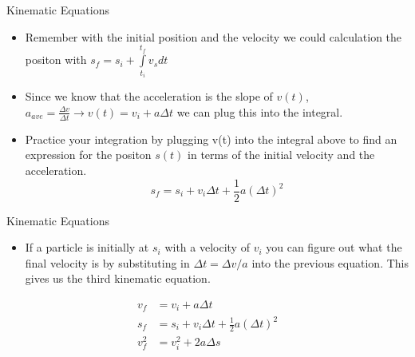\documentclass{beamer}
\begin{document}
\begin{frame}{Kinematic Equations}
\begin{itemize}
   \item Remember with the initial position and the velocity we could calculation the positon with $s_f = s_i + \int\limits_{t_i}^{t_f} v_s dt$
   \item Since we know that the acceleration is the slope of $v(t)$, $a_{ave}=\frac{\Delta v}{\Delta t} \rightarrow v(t) = v_i + a\Delta t$ we can plug this into the integral.
   \item<2-> Practice your integration by plugging v(t) into the integral above to find an expression for the positon $s(t)$ in terms of the initial velocity and the acceleration.
   \begin{equation*}
      s_f = s_i + v_i\Delta t + \frac{1}{2}a(\Delta t)^2
   \end{equation*}
\end{itemize}
\end{frame}

\begin{frame}{Kinematic Equations}
\begin{itemize}
   \item If a particle is initially at $s_i$ with a velocity of $v_i$ you can figure out what the final velocity is by substituting in $\Delta t = \Delta v/a$ into the previous equation. This gives us the third kinematic equation.
\end{itemize}
\begin{center}
\begin{shaded}
\begin{align}
   v_f &= v_i + a\Delta t \\
   s_f &= s_i + v_i\Delta t + \frac{1}{2}a(\Delta t)^2 \\
   v_f^2 &= v_i^2 + 2a\Delta s
\end{align}
\end{shaded}
\end{center}
\end{frame}
\end{document}
